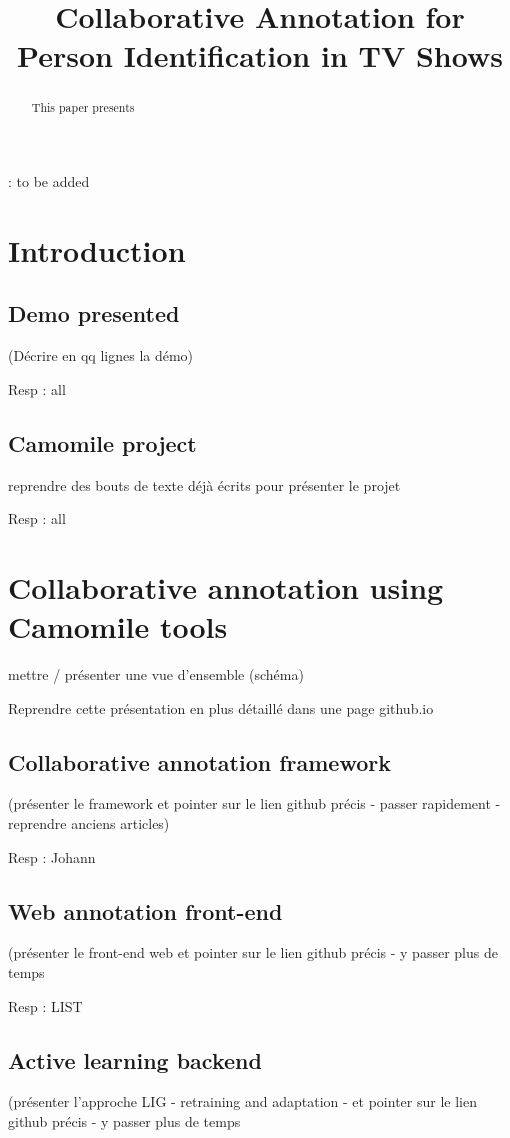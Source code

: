 \documentclass[a4paper]{article}
\title{Collaborative Annotation for Person Identification in TV Shows}
\begin{document}
  \maketitle
  \begin{abstract}
This paper presents 
  \end{abstract}
  : to be added

  \section{Introduction}
      \subsection{Demo presented}
(Décrire en qq lignes la démo) 

Resp : all

 \subsection{Camomile project}
reprendre des bouts de texte déjà écrits pour présenter le projet

Resp : all

      \section{Collaborative annotation using Camomile tools}

mettre / présenter une vue d'ensemble (schéma) 

Reprendre cette présentation en plus détaillé dans une page github.io 


      \subsection{Collaborative annotation framework}
(présenter le framework et pointer sur le lien github précis - passer rapidement - reprendre anciens articles)

Resp : Johann
  
      \subsection{Web annotation front-end}
(présenter le front-end web et pointer sur le lien github précis - y passer plus de temps 

Resp : LIST

      \subsection{Active learning backend}
(présenter l'approche LIG - retraining and adaptation - et pointer sur le lien github précis - y passer plus de temps 
\end{document}
